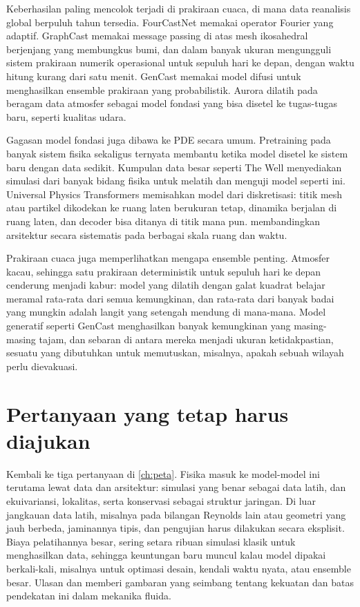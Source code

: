 Keberhasilan paling mencolok terjadi di prakiraan cuaca, di mana data reanalisis global berpuluh tahun
tersedia. FourCastNet \citep{pathak2022} memakai operator Fourier yang adaptif. GraphCast \citep{lam2023}
memakai message passing di atas mesh ikosahedral berjenjang yang membungkus bumi, dan dalam banyak ukuran
mengungguli sistem prakiraan numerik operasional untuk sepuluh hari ke depan, dengan waktu hitung kurang
dari satu menit. GenCast \citep{price2025} memakai model difusi untuk menghasilkan ensemble prakiraan
yang probabilistik. Aurora \citep{bodnar2024} dilatih pada beragam data atmosfer sebagai model fondasi yang
bisa disetel ke tugas-tugas baru, seperti kualitas udara.

Gagasan model fondasi juga dibawa ke PDE secara umum. Pretraining pada banyak sistem fisika sekaligus
\citep{mccabe2023} ternyata membantu ketika model disetel ke sistem baru dengan data sedikit. Kumpulan
data besar seperti The Well \citep{ohana2024} menyediakan simulasi dari banyak bidang fisika untuk
melatih dan menguji model seperti ini. Universal Physics Transformers \citep{alkin2024} memisahkan model
dari diskretisasi: titik mesh atau partikel dikodekan ke ruang laten berukuran tetap, dinamika berjalan di
ruang laten, dan decoder bisa ditanya di titik mana pun. \citet{gupta2022} membandingkan arsitektur
secara sistematis pada berbagai skala ruang dan waktu.

Prakiraan cuaca juga memperlihatkan mengapa ensemble penting. Atmosfer kacau, sehingga satu prakiraan
deterministik untuk sepuluh hari ke depan cenderung menjadi kabur: model yang dilatih dengan galat kuadrat belajar
meramal rata-rata dari semua kemungkinan, dan rata-rata dari banyak badai yang mungkin adalah langit yang
setengah mendung di mana-mana. Model generatif seperti GenCast menghasilkan banyak kemungkinan yang masing-masing
tajam, dan sebaran di antara mereka menjadi ukuran ketidakpastian, sesuatu yang dibutuhkan untuk memutuskan,
misalnya, apakah sebuah wilayah perlu dievakuasi.

\section{Pertanyaan yang tetap harus diajukan}

Kembali ke tiga pertanyaan di \cref{ch:peta}. Fisika masuk ke model-model ini terutama lewat data dan
arsitektur: simulasi yang benar sebagai data latih, dan ekuivariansi, lokalitas, serta konservasi sebagai
struktur jaringan. Di luar jangkauan data latih, misalnya pada bilangan Reynolds lain atau geometri yang
jauh berbeda, jaminannya tipis, dan pengujian harus dilakukan secara eksplisit. Biaya pelatihannya
besar, sering setara ribuan simulasi klasik untuk menghasilkan data, sehingga keuntungan baru muncul
kalau model dipakai berkali-kali, misalnya untuk optimasi desain, kendali waktu nyata, atau ensemble
besar. Ulasan \citet{lino2023} dan \citet{vinuesa2022} memberi gambaran yang seimbang tentang kekuatan
dan batas pendekatan ini dalam mekanika fluida.

